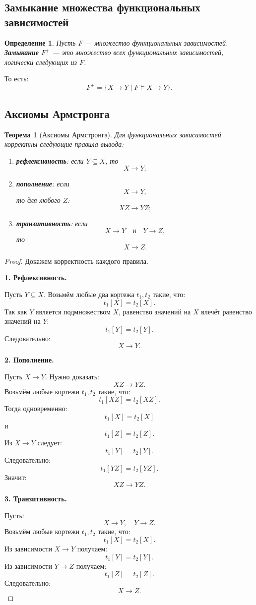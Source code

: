 \documentclass[12pt,a4paper]{article}
\newtheorem{definition}{Определение}[section]
\newtheorem{theorem}{Теорема}[section]
\theoremstyle{remark}
\begin{document}
\subsection{Замыкание множества функциональных зависимостей}

\begin{definition}
Пусть $F$ --- множество функциональных зависимостей. \textbf{Замыкание} $F^+$ --- это множество всех функциональных зависимостей, логически следующих из $F$.
\end{definition}

То есть:
\[
F^+ = \{X \to Y \mid F \models X \to Y\}.
\]

\subsection{Аксиомы Армстронга}

\begin{theorem}[Аксиомы Армстронга]
Для функциональных зависимостей корректны следующие правила вывода:
\begin{enumerate}
    \item \textbf{рефлексивность}: если $Y \subseteq X$, то
    \[
    X \to Y;
    \]
    \item \textbf{пополнение}: если
    \[
    X \to Y,
    \]
    то для любого $Z$:
    \[
    XZ \to YZ;
    \]
    \item \textbf{транзитивность}: если
    \[
    X \to Y
    \quad \text{и} \quad
    Y \to Z,
    \]
    то
    \[
    X \to Z.
    \]
\end{enumerate}
\end{theorem}

\begin{proof}
Докажем корректность каждого правила.

\textbf{1. Рефлексивность.}

Пусть $Y \subseteq X$. Возьмём любые два кортежа $t_1,t_2$ такие, что:
\[
t_1[X] = t_2[X].
\]
Так как $Y$ является подмножеством $X$, равенство значений на $X$ влечёт равенство значений на $Y$:
\[
t_1[Y] = t_2[Y].
\]
Следовательно:
\[
X \to Y.
\]

\textbf{2. Пополнение.}

Пусть $X \to Y$. Нужно доказать:
\[
XZ \to YZ.
\]
Возьмём любые кортежи $t_1,t_2$ такие, что:
\[
t_1[XZ] = t_2[XZ].
\]
Тогда одновременно:
\[
t_1[X] = t_2[X]
\]
и
\[
t_1[Z] = t_2[Z].
\]
Из $X \to Y$ следует:
\[
t_1[Y] = t_2[Y].
\]
Следовательно:
\[
t_1[YZ] = t_2[YZ].
\]
Значит:
\[
XZ \to YZ.
\]

\textbf{3. Транзитивность.}

Пусть:
\[
X \to Y,
\quad
Y \to Z.
\]
Возьмём любые кортежи $t_1,t_2$ такие, что:
\[
t_1[X] = t_2[X].
\]
Из зависимости $X \to Y$ получаем:
\[
t_1[Y] = t_2[Y].
\]
Из зависимости $Y \to Z$ получаем:
\[
t_1[Z] = t_2[Z].
\]
Следовательно:
\[
X \to Z.
\]
\end{proof}
\end{document}

